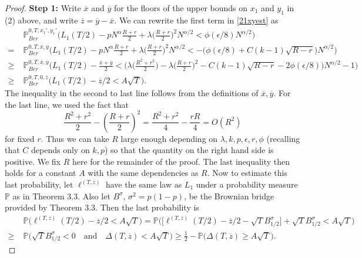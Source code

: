 \documentclass[12pt]{article}
\begin{document}
\begin{proof}
	\noindent\textbf{Step 1:} Write $\overline{x}$ and $\overline{y}$ for the floors of the upper bounds on $x_1$ and $y_1$ in (2) above, and write $\overline{z} = \overline{y}-\overline{x}$. We can rewrite the first term in \eqref{21xyest} as
	\begin{align*}
	&\mathbb{P}^{0,T,x_1',y_1'}_{Ber} \Big(L_1(T/2) - pN^\alpha \frac{R+r}{2} + \lambda\Big(\frac{R+r}{2}\Big)^2 N^{\alpha/2} < \phi(\epsilon/8)N^{\alpha/2}\Big)\\
	= \; & \mathbb{P}^{0,T,\overline{x},\overline{y}}_{Ber}\Big(L_1(T/2) - pN^\alpha\frac{R+r}{2} + \lambda\Big(\frac{R+r}{2}\Big)^2 N^{\alpha/2} < -\big(\phi(\epsilon/8) + C(k-1)\sqrt{R-r}\big)N^{\alpha/2}\Big)\\
	\geq \; & \mathbb{P}^{0,T,\overline{x},\overline{y}}_{Ber}\Big(L_1(T/2) - \frac{\overline{x} + \overline{y}}{2} < \Big( \lambda\Big(\frac{R^2+r^2}{2}\Big) - \lambda\Big(\frac{R+r}{2}\Big)^2 - C(k-1)\sqrt{R-r} - 2\phi(\epsilon/8)\Big)N^{\alpha/2} - 1\Big)\\
	\geq \; & \mathbb{P}^{0,T,0,\overline{z}}_{Ber}\Big(L_1(T/2) - \overline{z}/2 < A\sqrt{T}\Big).
	\end{align*}
	The inequality in the second to last line follows from the definitions of $\overline{x},\overline{y}$. For the last line, we used the fact that
	\[
	\frac{R^2+r^2}{2} - \left(\frac{R+r}{2}\right)^2 = \frac{R^2 + r^2}{4} - \frac{rR}{4} = O(R^2)
	\]
	for fixed $r$. Thus we can take $R$ large enough depending on $\lambda,k,p,\epsilon,r,\phi$ (recalling that $C$ depends only on $k,p$) so that the quantity on the right hand side is positive. We fix $R$ here for the remainder of the proof. The last inequality then holds for a constant $A$ with the same dependencies as $R$. Now to estimate this last probability, let $\ell^{(T,\overline{z})}$ have the same law as $L_1$ under a probability measure $\mathbb{P}$ as in Theorem 3.3. Also let $B^\sigma$, $\sigma^2 = p(1-p)$, be the Brownian bridge provided by Theorem 3.3. Then the last probability is
	\begin{align*}
	& \mathbb{P}\Big( \ell^{(T,\overline{z})}(T/2) - \overline{z}/2 < A\sqrt{T}\Big) = \mathbb{P}\Big(\Big[\ell^{(T,\overline{z})}(T/2) - \overline{z}/2 - \sqrt{T}B^\sigma_{1/2}\Big] + \sqrt{T}B^\sigma_{1/2} < A\sqrt{T}\Big)\\
	\geq \; & \mathbb{P}\Big(\sqrt{T}B^\sigma_{1/2} < 0\quad\mathrm{and}\quad \Delta(T,\overline{z}) < A\sqrt{T}\Big) \geq \frac{1}{2} - \mathbb{P}\Big(\Delta(T,\overline{z}) \geq A\sqrt{T}\Big).
	\end{align*}

\end{proof}
\end{document}
